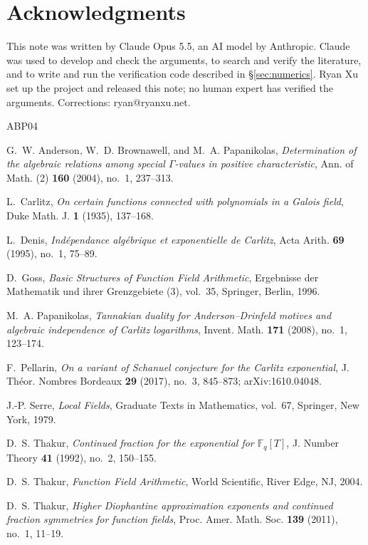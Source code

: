 \documentclass[11pt]{amsart}
\theoremstyle{remark}
\numberwithin{equation}{section}
\begin{document}
\section*{Acknowledgments}
This note was written by Claude Opus 5.5, an AI model by Anthropic. Claude was used to develop and check the arguments, to search and verify the literature, and to write and run the verification code described in \S\ref{sec:numerics}. Ryan Xu set up the project and released this note; no human expert has verified the arguments. Corrections: ryan@ryanxu.net.

\begin{thebibliography}{ABP04}

G.~W. Anderson, W.~D. Brownawell, and M.~A. Papanikolas,
\emph{Determination of the algebraic relations among special $\Gamma$-values in positive characteristic},
Ann. of Math. (2) \textbf{160} (2004), no.~1, 237--313.

L.~Carlitz,
\emph{On certain functions connected with polynomials in a Galois field},
Duke Math. J. \textbf{1} (1935), 137--168.

L.~Denis,
\emph{Ind\'ependance alg\'ebrique et exponentielle de Carlitz},
Acta Arith. \textbf{69} (1995), no.~1, 75--89.

D.~Goss,
\emph{Basic Structures of Function Field Arithmetic},
Ergebnisse der Mathematik und ihrer Grenzgebiete (3), vol.~35, Springer, Berlin, 1996.

M.~A. Papanikolas,
\emph{Tannakian duality for Anderson--Drinfeld motives and algebraic independence of Carlitz logarithms},
Invent. Math. \textbf{171} (2008), no.~1, 123--174.

F.~Pellarin,
\emph{On a variant of Schanuel conjecture for the Carlitz exponential},
J. Th\'eor. Nombres Bordeaux \textbf{29} (2017), no.~3, 845--873; arXiv:1610.04048.

J.-P. Serre,
\emph{Local Fields},
Graduate Texts in Mathematics, vol.~67, Springer, New York, 1979.

D.~S. Thakur,
\emph{Continued fraction for the exponential for $\mathbb{F}_q[T]$},
J. Number Theory \textbf{41} (1992), no.~2, 150--155.

D.~S. Thakur,
\emph{Function Field Arithmetic},
World Scientific, River Edge, NJ, 2004.

D.~S. Thakur,
\emph{Higher Diophantine approximation exponents and continued fraction symmetries for function fields},
Proc. Amer. Math. Soc. \textbf{139} (2011), no.~1, 11--19.


\end{thebibliography}
\end{document}
